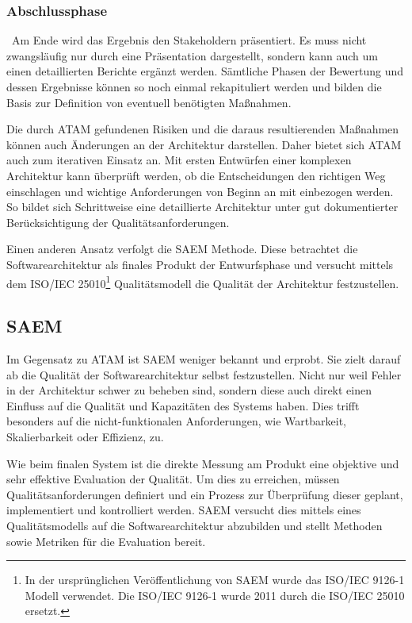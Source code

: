 \subsubsection{Abschlussphase}
\
Am Ende wird das Ergebnis den Stakeholdern präsentiert. Es muss nicht zwangsläufig nur durch eine Präsentation dargestellt, sondern kann auch um einen detaillierten Berichte ergänzt werden. Sämtliche Phasen der Bewertung und dessen Ergebnisse können so noch einmal rekapituliert werden und bilden die Basis zur Definition von eventuell benötigten Maßnahmen.

Die durch \ac{ATAM} gefundenen Risiken und die daraus resultierenden Maßnahmen können auch Änderungen an der Architektur darstellen. Daher bietet sich \ac{ATAM} auch zum iterativen Einsatz an. Mit ersten Entwürfen einer komplexen Architektur kann überprüft werden, ob die Entscheidungen den richtigen Weg einschlagen und wichtige Anforderungen von Beginn an mit einbezogen werden. So bildet sich Schrittweise eine detaillierte Architektur unter gut dokumentierter Berücksichtigung der Qualitätsanforderungen. 

Einen anderen Ansatz verfolgt die \ac{SAEM} Methode. Diese betrachtet die Softwarearchitektur als finales Produkt der Entwurfsphase und versucht mittels dem ISO/IEC 25010\footnote{
	In der ursprünglichen Veröffentlichung von \ac{SAEM} wurde das ISO/IEC 9126-1 Modell verwendet. Die ISO/IEC 9126-1 wurde 2011 durch die ISO/IEC 25010 ersetzt.
}
Qualitätsmodell die Qualität der Architektur festzustellen.


\subsection{\acf*{SAEM}}

Im Gegensatz zu \ac{ATAM} ist \ac{SAEM} weniger bekannt und erprobt\cite{IEEE_TSE2002}. Sie zielt darauf ab die Qualität der Softwarearchitektur selbst festzustellen. Nicht nur weil Fehler in der Architektur schwer zu beheben sind, sondern diese auch direkt einen Einfluss auf die Qualität und Kapazitäten des Systems haben\cite{Duenas1998}. Dies trifft besonders auf die nicht-funktionalen Anforderungen, wie Wartbarkeit, Skalierbarkeit oder Effizienz, zu.

Wie beim finalen System ist die direkte Messung am Produkt eine objektive und sehr effektive Evaluation der Qualität. Um dies zu erreichen, müssen Qualitätsanforderungen definiert und ein Prozess zur Überprüfung dieser  geplant, implementiert und kontrolliert werden\cite{Duenas1998}. \ac{SAEM} versucht dies mittels eines Qualitätsmodells auf die Softwarearchitektur abzubilden und stellt Methoden sowie Metriken für die Evaluation bereit. 


